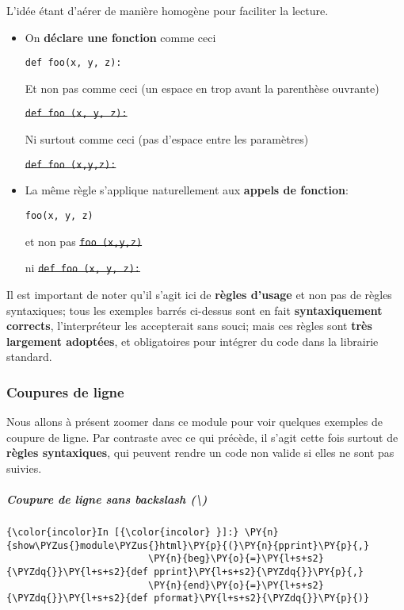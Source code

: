 L'idée étant d'aérer de manière homogène pour faciliter la lecture.

    \begin{itemize}
\item
  On \textbf{déclare une fonction} comme ceci

  \texttt{def\ foo(x,\ y,\ z):}

  Et non pas comme ceci (un espace en trop avant la parenthèse ouvrante)

  \sout{\texttt{def\ foo\ (x,\ y,\ z):}}

  Ni surtout comme ceci (pas d'espace entre les paramètres)

  \sout{\texttt{def\ foo\ (x,y,z):}}
\end{itemize}

    \begin{itemize}
\item
  La même règle s'applique naturellement aux \textbf{appels de
  fonction}:

  \texttt{foo(x,\ y,\ z)}

  et non pas \sout{\texttt{foo\ (x,y,z)}}

  ni \sout{\texttt{def\ foo\ (x,\ y,\ z):}}
\end{itemize}

    Il est important de noter qu'il s'agit ici de \textbf{règles d'usage} et
non pas de règles syntaxiques; tous les exemples barrés ci-dessus sont
en fait \textbf{syntaxiquement corrects}, l'interpréteur les accepterait
sans souci; mais ces règles sont \textbf{très largement adoptées}, et
obligatoires pour intégrer du code dans la librairie standard.

    \hypertarget{coupures-de-ligne}{%
\subsubsection{Coupures de ligne}\label{coupures-de-ligne}}

    Nous allons à présent zoomer dans ce module pour voir quelques exemples
de coupure de ligne. Par contraste avec ce qui précède, il s'agit cette
fois surtout de \textbf{règles syntaxiques}, qui peuvent rendre un code
non valide si elles ne sont pas suivies.

    \hypertarget{coupure-de-ligne-sans-backslash}{%
\subparagraph{\texorpdfstring{Coupure de ligne sans \emph{backslash}
(\textbackslash{})}{Coupure de ligne sans backslash (\textbackslash{})}}\label{coupure-de-ligne-sans-backslash}}

    \begin{Verbatim}[commandchars=\\\{\}]
{\color{incolor}In [{\color{incolor} }]:} \PY{n}{show\PYZus{}module\PYZus{}html}\PY{p}{(}\PY{n}{pprint}\PY{p}{,} 
                         \PY{n}{beg}\PY{o}{=}\PY{l+s+s2}{\PYZdq{}}\PY{l+s+s2}{def pprint}\PY{l+s+s2}{\PYZdq{}}\PY{p}{,}
                         \PY{n}{end}\PY{o}{=}\PY{l+s+s2}{\PYZdq{}}\PY{l+s+s2}{def pformat}\PY{l+s+s2}{\PYZdq{}}\PY{p}{)}
\end{Verbatim}


